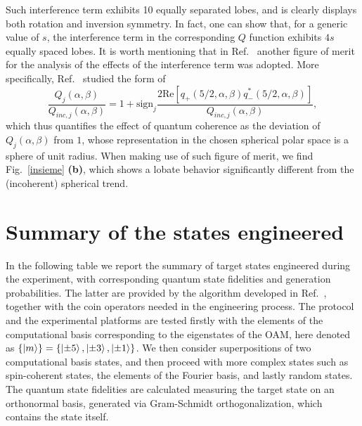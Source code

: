 Such interference term exhibits 10 equally separated lobes, and is clearly displays both rotation and inversion symmetry. In fact, one can show that, for a generic value of $s$, the interference term in the corresponding $Q$ function exhibits $4s$ equally spaced lobes. It is worth mentioning that in Ref.~\cite{agarwal1997atomic} another figure of merit for the analysis of the effects of the interference term was adopted. More specifically, Ref.~\cite{agarwal1997atomic} studied the form of 
\begin{equation}
\frac{Q_j(\alpha,\beta)}{Q_{inc,j}(\alpha,\beta)}=1+\text{sign}_j\frac{2\text{Re}[q_+(5/2,\alpha,\beta)q^*_-(5/2,\alpha,\beta)]}{Q_{inc,j}(\alpha,\beta)},
\end{equation}
which thus quantifies the effect of quantum coherence as the deviation of $Q_j(\alpha,\beta)$ from $1$, whose representation in the chosen spherical polar space is a sphere of unit radius. When making use of such figure of merit, we find Fig.~\ref{insieme} {\bf (b)}, which shows a lobate behavior significantly different from the (incoherent) spherical trend. 

\section{Summary of the states engineered}

In the following table we report the summary of target states engineered during the experiment, with corresponding quantum state fidelities and generation probabilities. The latter are provided by the algorithm developed in Ref.~\cite{innocenti2017quantum}, together with the coin operators needed in the engineering process.
The protocol and the experimental platforms are tested firstly with the elements of the computational basis corresponding to the eigenstates of the OAM, here denoted as $\{\ket{m} \}=\{\ket{\pm5}, \ket{\pm3},\ket{\pm1} \}$. We then consider superpositions of two computational basis states, and then proceed with more complex states such as spin-coherent states, the elements of the Fourier basis, and lastly random states. The quantum state fidelities are calculated measuring the target state on an orthonormal basis, generated via Gram-Schmidt orthogonalization, which contains the state itself.

